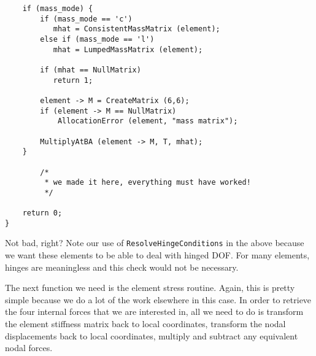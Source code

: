 {\begin{screen}
\begin{verbatim}
    if (mass_mode) {
        if (mass_mode == 'c')
           mhat = ConsistentMassMatrix (element);
        else if (mass_mode == 'l')
           mhat = LumpedMassMatrix (element);

        if (mhat == NullMatrix)
           return 1;

        element -> M = CreateMatrix (6,6);
        if (element -> M == NullMatrix)
            AllocationError (element, "mass matrix");

        MultiplyAtBA (element -> M, T, mhat);
    }

        /*
         * we made it here, everything must have worked!
         */

    return 0;
}
 \end{verbatim}
\end{screen}}

Not bad, right?  Note our use of \mbox{{\tt ResolveHingeConditions}} in the
above because we want these elements to be able to deal with hinged
DOF.  For many elements, hinges are meaningless and this check
would not be necessary.

The next function we need is the element stress routine.  Again, this
is pretty simple because we do a lot of the work elsewhere in this case.
In order to retrieve the four internal forces that we are interested
in, all we need to do is transform the element stiffness matrix back
to local coordinates, transform the nodal displacements back to local
coordinates, multiply and subtract any equivalent nodal forces.

